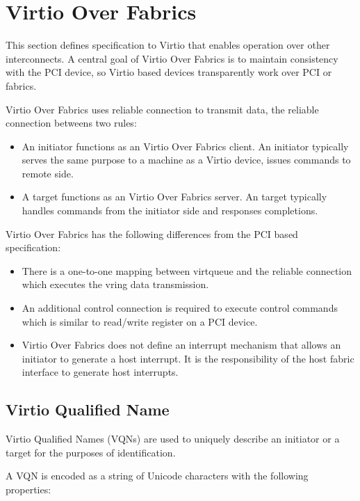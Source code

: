 \section{Virtio Over Fabrics}\label{sec:Virtio Transport Options / Virtio Over Fabrics}

This section defines specification to Virtio that enables operation over other
interconnects. A central goal of Virtio Over Fabrics is to maintain consistency
with the PCI device, so Virtio based devices transparently work over PCI or
fabrics.

Virtio Over Fabrics uses reliable connection to transmit data, the reliable connection betweens two rules:

\begin{itemize}
\item An initiator functions as an Virtio Over Fabrics client. An initiator typically serves the same purpose to a machine as a Virtio device, issues commands to remote side.
\item A target functions as an Virtio Over Fabrics server. An target typically handles commands from the initiator side and responses completions.
\end{itemize}

Virtio Over Fabrics has the following differences from the PCI based specification:

\begin{itemize}
\item There is a one-to-one mapping between virtqueue and the reliable connection which executes the vring data transmission.
\item An additional control connection is required to execute control commands which is similar to read/write register on a PCI device.
\item Virtio Over Fabrics does not define an interrupt mechanism that allows an initiator to generate a host interrupt. It is the responsibility of the host fabric interface to generate host interrupts.
\end{itemize}

\subsection{Virtio Qualified Name}\label{sec:Virtio Transport Options / Virtio Over Fabrics / Virtio Qualified Name}
Virtio Qualified Names (VQNs) are used to uniquely describe an initiator or a target for the purposes of identification.

A VQN is encoded as a string of Unicode characters with the following properties:

